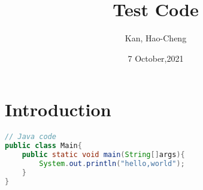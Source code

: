\documentclass{report} %
\title{\textbf{Test Code}}
\author{Kan, Hao-Cheng}
\date{7 October,2021}
\begin{document}
\maketitle

\section{Introduction}

	\begin{lstlisting}[language={java}]
// Java code
public class Main{
	public static void main(String[]args){
		System.out.println("hello,world");
	}
}
	\end{lstlisting}
\end{document}
